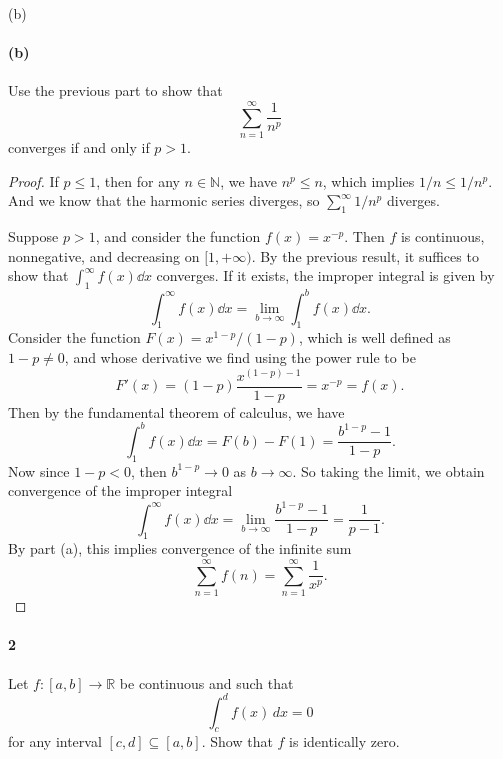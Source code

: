 \documentclass[12pt]{article}
\newenvironment{fullbox}{\begin{lrbox}{\savefullbox}\begin{minipage}{\dimexpr\textwidth-2\fboxsep\relax}}{\end{minipage}\end{lrbox}\begin{center}\framebox[\textwidth]{\usebox{\savefullbox}}\end{center}}
\newenvironment{pbox}[1][]{\begin{fullbox}\ifx#1\empty\else\paragraph{#1}\fi}{\end{fullbox}}
\theoremstyle{definition}
\newcommand{\N}{\mathbb{N}}
\newcommand{\R}{\mathbb{R}}
\begin{document}
\begin{pbox}[(b)]
    Use the previous part to show that 
    \begin{equation}
    \sum_{n=1}^\infty \frac{1}{n^p}
    \end{equation}
    converges if and only if $p>1$.
\end{pbox}

\begin{proof}
    If $p \leq 1$, then for any $n \in \N$, we have $n^{p} \leq n$, which implies $1/n \leq 1/n^p$. And we know that the harmonic series diverges, so $\sum_{1}^{\infty} 1/n^p$ diverges.
    
    Suppose $p>1$, and consider the function $f(x) = x^{-p}$. Then $f$ is continuous, nonnegative, and decreasing on $[1, +\infty)$. By the previous result, it suffices to show that $\int_{1}^{\infty} f(x) \dd{x}$ converges. If it exists, the improper integral is given by
    \[
        \int_{1}^{\infty} f(x) \dd{x} = \lim_{b \to \infty} \int_{1}^{b} f(x) \dd{x}.
    \]
    Consider the function $F(x) = x^{1-p}/(1-p)$, which is well defined as $1-p \ne 0$, and whose derivative we find using the power rule to be
    \[
        F'(x) = (1-p)\frac{x^{(1-p)-1}}{1-p} = x^{-p} = f(x).
    \]
    Then by the fundamental theorem of calculus, we have
    \[
        \int_{1}^{b} f(x) \dd{x}
            = F(b) - F(1)
            = \frac{b^{1-p} - 1}{1-p}.
    \]
    Now since $1-p < 0$, then $b^{1-p} \to 0$ as $b \to \infty$. So taking the limit, we obtain convergence of the improper integral
    \[
        \int_{1}^{\infty} f(x) \dd{x}
            = \lim_{b\to\infty} \frac{b^{1-p} - 1}{1-p}
            = \frac{1}{p-1}.
    \]
    By part (a), this implies convergence of the infinite sum
    \[
        \sum_{n=1}^{\infty} f(n) = \sum_{n=1}^{\infty} \frac{1}{x^p}.
    \]
    
\end{proof}






\begin{pbox}[2]
    Let $f:[a,b]\to \R$ be continuous and such that 
    \begin{equation}
    \int_c^df(x)\,dx = 0
    \end{equation}
    for any interval $[c,d]\subseteq [a,b]$. Show that $f$ is identically zero.
\end{pbox}
\end{document}
